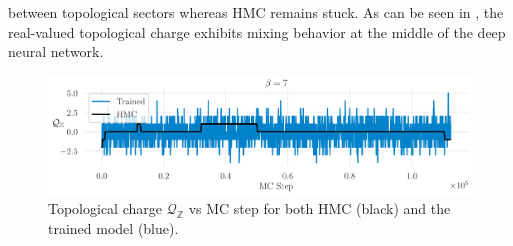\documentclass{article} %
\begin{document}
between topological sectors whereas HMC remains stuck.
%
As can be seen in , the real-valued topological charge exhibits mixing behavior at the middle of the
deep neural network.
%
\begin{figure}[htpb]
   \centering
   \includegraphics[width=\textwidth]{figures/topological_freezing_anl_blue_wide.pdf}
   \caption{\label{fig:topfreeze}Topological charge \(\mathcal{Q}_{\mathbb{Z}}\) vs MC
   step for both HMC (black) and the trained model (blue).}
\end{figure}
%
\end{document}
